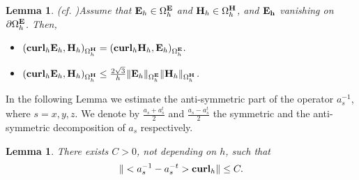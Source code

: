 \documentclass[12pt,reqno]{amsart}
\newcommand{\curl}{{\bf curl}}
\newcommand{\e}{{\bf E}}
\newcommand{\h}{{\bf H}}
\newtheorem{lem}[theorem]{Lemma}
\newtheorem{lemma}[theorem]{Lemma}
\theoremstyle{definition}
\numberwithin{equation}{section}
\def\Gwh{\Omega_h}
\begin{document}
\begin{lemma}(cf. \cite[(37)]{sakka} )\label{lem:sym}
	Assume that $\e_h\in \Gwh^\e$ and $\h_h\in \Gwh^\h$, and
	$\bf{E}_h$ vanishing on $\partial \Gwh^{\bf{E}}$. Then,
	\begin{itemize}
		\item  
		$
		(\curl_h\e_h,\h_h)_{\Gwh^\h}=
		(\curl_h\h_h,\e_h)_{\Gwh^\e}.
		$\\[1mm]
		\item $(\curl _h\e_h,\h_h)_{\Gwh^\h}\leq
		  \frac{2\sqrt{3}}{h}\|\e_h\|_{\Gwh^\e}
		\|\h_h\|_{\Gwh^\h}
		$.

	\end{itemize}

\end{lemma}

In the following Lemma we estimate the anti-symmetric part of the operator $a_s^{-1}$, where $s=x,y,z$.
    We denote by $\frac{a_s+a_s^t}{2}$ and $\frac{a_s-a_s^t}{2}$ the symmetric and the anti-symmetric decomposition of $a_s$ respectively.
\begin{lem}\label{lem:antiestimates}
	There exists $C>0$, not depending on $h$, such that $$\|<a_s^{-1}-a_s^{-t}>\curl_h\|\leq C.$$
\end{lem}
\end{document}

